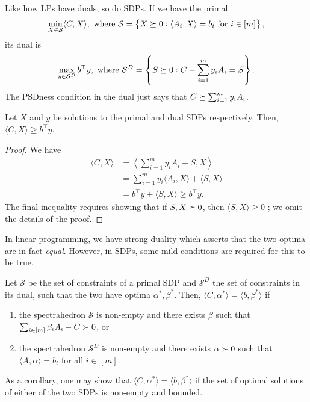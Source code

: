 	Like how LPs have duals, so do SDPs. If we have the primal
	\[ \min_{X \in \mathcal{S}} \langle C,X\rangle , \text{ where } \mathcal{S} = \left\{ X \succeq 0 : \langle A_i,X\rangle = b_i \text{ for $i \in [m]$} \right\}, \]
	its dual is
	\[ \max_{y \in \mathcal{S}^D} b^\top y, \text{ where } \mathcal{S}^D = \left\{ S \succeq 0 : C - \sum_{i=1}^m y_i A_i = S \right\}. \]
	The PSDness condition in the dual just says that $C \succeq \sum_{i=1}^m y_i A_i$.

	\begin{fprop}
		Let $X$ and $y$ be solutions to the primal and dual SDPs respectively. Then, $\langle C,X\rangle \ge b^\top y$.
	\end{fprop}
	\begin{proof}
		We have
		\begin{align*}
			\langle C,X\rangle &= \left\langle \sum_{i=1}^m y_i A_i + S , X \right\rangle \\
				&= \sum_{i=1}^m y_i \langle A_i,X\rangle + \langle S,X\rangle \\
				&= b^\top y + \langle S,X\rangle \ge b^\top y.
		\end{align*}
		The final inequality requires showing that if $S,X \succeq 0$, then $\langle S,X\rangle \ge 0$%
		; we omit the details of the proof.
	\end{proof}

	In linear programming, we have strong duality which asserts that the two optima are in fact \emph{equal}. However, in SDPs, some mild conditions are required for this to be true. 

	\begin{ftheo}
		Let $\mathcal{S}$ be the set of constraints of a primal SDP and $\mathcal{S}^D$ the set of constraints in its dual, such that the two have optima $\alpha^*,\beta^*$. Then, $\langle C,\alpha^*\rangle = \langle b,\beta^*\rangle$ if
		\begin{enumerate}
			\item the spectrahedron $\mathcal{S}$ is non-empty and there exists $\beta$ such that $\sum_{i \in [m]}\beta_i A_i - C \succ 0$, or
			\item the spectrahedron $\mathcal{S}^D$ is non-empty and there exists $\alpha \succ 0$ such that $ \langle A,\alpha\rangle = b_i$ for all $i \in [m]$.
		\end{enumerate}
		As a corollary, one may show that $\langle C,\alpha^*\rangle = \langle b,\beta^*\rangle$ if the set of optimal solutions of either of the two SDPs is non-empty and bounded.
	\end{ftheo}

